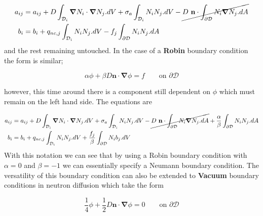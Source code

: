\documentclass[11pt,letterpaper,titlepage]{article}
\newcommand{\bOmega}{\mathcal{D}}
\newcommand{\bnabla}{\boldsymbol{\nabla}}
\numberwithin{equation}{section}
\begin{document}
\begin{equation*}
\begin{aligned}
a_{ij} &=a_{ij} +  D \int_{\bOmega_i} \bnabla N_i  \cdot  \bnabla N_j .dV + 
\sigma_a \int_{\bOmega_i} N_i N_j.dV - \cancel{
D \  \mathbf{n} \cdot \int_{\partial \bOmega} N_i  \bnabla N_j .dA} \\
b_i &= b_i 
+ q_{nc,j} \int_{\bOmega_i}  N_i  N_j .dV - f_j \int_{\partial\bOmega}  N_i  N_j .dA
\end{aligned}
\end{equation*}
and the rest remaining untouched.
\newline
\newline
In the case of a \textbf{Robin} boundary condition the form is similar;

\begin{equation*}
\alpha \phi+\beta D \mathbf{n} \cdot \bnabla \phi = f \quad \quad \text{on } \partial \bOmega
\end{equation*}

however, this time around there is a component still dependent on $\phi$ which must remain on the left hand side. The equations are

\begin{equation*}
\begin{aligned}
a_{ij} &=a_{ij} +  D \int_{\bOmega_i} \bnabla N_i  \cdot  \bnabla N_j .dV + 
\sigma_a \int_{\bOmega_i} N_i N_j.dV - \cancel{
D \  \mathbf{n} \cdot \int_{\partial \bOmega} N_i  \bnabla N_j .dA} 
+ 
\frac{\alpha}{\beta} \int_{\partial\bOmega} N_i N_j.dA\\
b_i &= b_i 
+ q_{nc,j} \int_{\bOmega_i}  N_i  N_j .dV + \frac{f_j}{\beta} \int_{\partial\bOmega}  N_i  b_j .dV
\end{aligned}
\end{equation*}
\newline
With this notation we can see that by using a Robin boundary condition with $\alpha=0$ and $\beta=-1$ we can essentially specify a Neumann boundary condition.
\newline
\newline
The versatility of this boundary condition can also be extended to \textbf{Vacuum} boundary conditions in neutron diffusion which take the form

\begin{equation*}
\frac{1}{4}\phi + \frac{1}{2}D\mathbf{n}\cdot\bnabla\phi = 0 \quad \quad \text{on } \partial \bOmega
\end{equation*}
\end{document}
